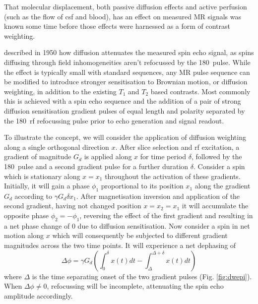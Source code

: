 \documentclass[12pt,phd,a4paper,twoside]{ucl_thesis}
\renewcommand{\textcite}[2][]{
\ifthenelse { \equal {#1} {} }  {\citeauthor{#2}\autocite{#2}}   {\citeauthor{#1}\autocite{#2}}}
\begin{document}
That molecular displacement, both passive diffusion effects and active perfusion (such as the flow of \gls{csf} and blood\autocite{LeBihan1988}), has an effect on measured MR signals was known some time before those effects were harnessed as a form of contrast weighting.
\textcite{Hahn1950} described in 1950 how diffusion attenuates the measured spin echo signal, as spins diffusing through field inhomogeneities aren't refocussed by the 180\textdegree\ pulse.
While the effect is typically small with standard sequences, any MR pulse sequence can be modified to introduce stronger sensitisation to Brownian motion, or diffusion weighting, in addition to the existing $T_1$ and $T_2$ based contrasts.
Most commonly this is achieved with a spin echo sequence and the addition of a pair of strong diffusion sensitisation gradient pulses of equal length and polarity separated by the 180\textdegree\ \gls{rf} refocussing pulse prior to echo generation and signal readout.

To illustrate the concept, we will consider the application of diffusion weighting along a single orthogonal direction $x$.
After slice selection and \gls{rf} excitation, a gradient of magnitude $G_d$ is applied along $x$ for time period $\delta$, followed by the 180\textdegree\ pulse and a second gradient pulse for a further duration $\delta$.
Consider a spin which is stationary along $x=x_1$ throughout the activation of these gradients.
Initially, it will gain a phase $\phi_1$ proportional to its position $x_1$ along the gradient $G_d$ according to $\gamma G_d \delta x_1$.
After magnetisation inversion and application of the second gradient, having not changed position $x=x_2=x_1$ it will accumulate the opposite phase $\phi_2 = -\phi_1$, reversing the effect of the first gradient and resulting in a net phase change of $0$ due to diffusion sensitisation.
Now consider a spin in net motion along $x$ which will consequently be subjected to different gradient magnitudes across the two time points.
It will experience a net dephasing of
\begin{equation}
  \Delta\phi = \gamma G_d (\int_0^{\delta} x(t) dt - \int_{\Delta}^{\Delta+\delta} x(t) dt)
\end{equation}
where $\Delta$ is the time separating onset of the two gradient pulses (Fig. \ref{fig:dwepi}).
When $\Delta\phi \neq 0$, refocussing will be incomplete, attenuating the spin echo amplitude accordingly.
\end{document}
